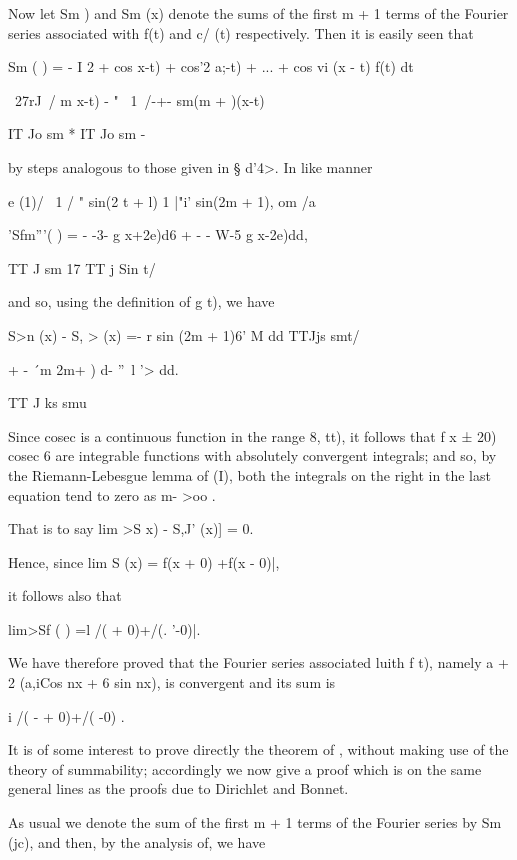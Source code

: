 %
%

Now let Sm ) and Sm (x) denote the sums of the first m + 1 terms of
the Fourier series associated with f(t) and c/ (t) respectively. Then
it is easily seen that

Sm ( ) = - I 2 + cos x-t) + cos'2 a;-t) + ... + cos vi (x - t) f(t) dt

~27rJ\ / m x-t) - " \ 1\ /-+- sm(m + )(x-t)

IT Jo sm * IT Jo sm -

by steps analogous to those given in § d'4>. In like manner

e (1)/ \ 1 / " sin(2 t + l) 1 |"i' sin(2m + 1), om /a

'Sfm'''( ) = - -3- g x+2e)d6 + - - W-5 g x-2e)dd,

TT J sm 17 TT j Sin t/

and so, using the definition of g t), we have

S>n (x) - S, > (x) =- r sin (2m + 1)6' M dd TTJjs smt/

+ - \'\ m 2m+ ) d- ''~l '> dd.

TT J ks smu

Since cosec is a continuous function in the range 8, tt), it follows
that f x ± 20) cosec 6 are integrable functions with absolutely
convergent integrals; and so, by the Riemann-Lebesgue lemma of
(I), both the integrals on the right in the last equation tend to zero
as m- >oo .

That is to say lim >S x) - S,J' (x)] = 0.

Hence, since lim S (x) = f(x + 0) +f(x - 0)|,

it follows also that

lim>Sf ( ) =l /( + 0)+/(. '-0)|.

We have therefore proved that the Fourier series associated luith f
t), namely a + 2 (a,iCos nx + 6 sin nx), is convergent and its sum is

i /( - + 0)+/( -0) .

It is of some interest to prove directly the theorem of ,
without making use of the theory of summability; accordingly we now
give a proof which is on the same general lines as the proofs due to
Dirichlet and Bonnet.

%
%

As usual we denote the sum of the first m + 1 terms of the Fourier
series by Sm (jc), and then, by the analysis of, we have

